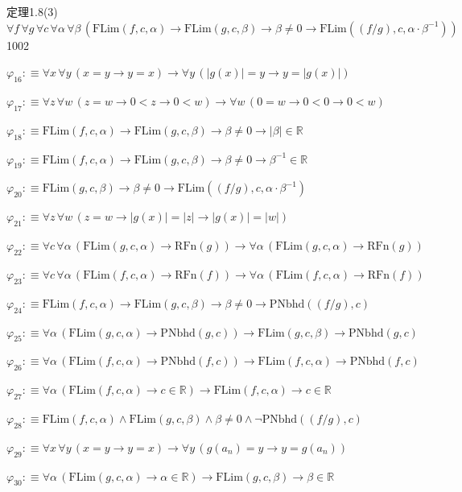 \begin{fullproof}{定理1.8(3)}{$\forall f\,\forall g\,\forall c\,\forall \alpha\,\forall \beta\,(\mathrm{FLim}(f,c,\alpha) \to \mathrm{FLim}(g,c,\beta) \to \beta \neq 0 \to \mathrm{FLim}((f / g),c,\alpha \cdot \beta^{-1}))$}{1002}
\begin{abbrevlist}
\item $\varphi_{16} :\equiv \forall x\,\forall y\,(x = y \to y = x) \to \forall y\,(\lvert g(x) \rvert = y \to y = \lvert g(x) \rvert)$
\item $\varphi_{17} :\equiv \forall z\,\forall w\,(z = w \to 0 < z \to 0 < w) \to \forall w\,(0 = w \to 0 < 0 \to 0 < w)$
\item $\varphi_{18} :\equiv \mathrm{FLim}(f,c,\alpha) \to \mathrm{FLim}(g,c,\beta) \to \beta \neq 0 \to \lvert \beta \rvert \in \mathbb{R}$
\item $\varphi_{19} :\equiv \mathrm{FLim}(f,c,\alpha) \to \mathrm{FLim}(g,c,\beta) \to \beta \neq 0 \to \beta^{-1} \in \mathbb{R}$
\item $\varphi_{20} :\equiv \mathrm{FLim}(g,c,\beta) \to \beta \neq 0 \to \mathrm{FLim}((f / g),c,\alpha \cdot \beta^{-1})$
\item $\varphi_{21} :\equiv \forall z\,\forall w\,(z = w \to \lvert g(x) \rvert = \lvert z \rvert \to \lvert g(x) \rvert = \lvert w \rvert)$
\item $\varphi_{22} :\equiv \forall c\,\forall \alpha\,(\mathrm{FLim}(g,c,\alpha) \to \mathrm{RFn}(g)) \to \forall \alpha\,(\mathrm{FLim}(g,c,\alpha) \to \mathrm{RFn}(g))$
\item $\varphi_{23} :\equiv \forall c\,\forall \alpha\,(\mathrm{FLim}(f,c,\alpha) \to \mathrm{RFn}(f)) \to \forall \alpha\,(\mathrm{FLim}(f,c,\alpha) \to \mathrm{RFn}(f))$
\item $\varphi_{24} :\equiv \mathrm{FLim}(f,c,\alpha) \to \mathrm{FLim}(g,c,\beta) \to \beta \neq 0 \to \mathrm{PNbhd}((f / g),c)$
\item $\varphi_{25} :\equiv \forall \alpha\,(\mathrm{FLim}(g,c,\alpha) \to \mathrm{PNbhd}(g,c)) \to \mathrm{FLim}(g,c,\beta) \to \mathrm{PNbhd}(g,c)$
\item $\varphi_{26} :\equiv \forall \alpha\,(\mathrm{FLim}(f,c,\alpha) \to \mathrm{PNbhd}(f,c)) \to \mathrm{FLim}(f,c,\alpha) \to \mathrm{PNbhd}(f,c)$
\item $\varphi_{27} :\equiv \forall \alpha\,(\mathrm{FLim}(f,c,\alpha) \to c \in \mathbb{R}) \to \mathrm{FLim}(f,c,\alpha) \to c \in \mathbb{R}$
\item $\varphi_{28} :\equiv \mathrm{FLim}(f,c,\alpha) \land \mathrm{FLim}(g,c,\beta) \land \beta \neq 0 \land \neg \mathrm{PNbhd}((f / g),c)$
\item $\varphi_{29} :\equiv \forall x\,\forall y\,(x = y \to y = x) \to \forall y\,(g(a_{n}) = y \to y = g(a_{n}))$
\item $\varphi_{30} :\equiv \forall \alpha\,(\mathrm{FLim}(g,c,\alpha) \to \alpha \in \mathbb{R}) \to \mathrm{FLim}(g,c,\beta) \to \beta \in \mathbb{R}$

\end{abbrevlist}
\end{fullproof}

